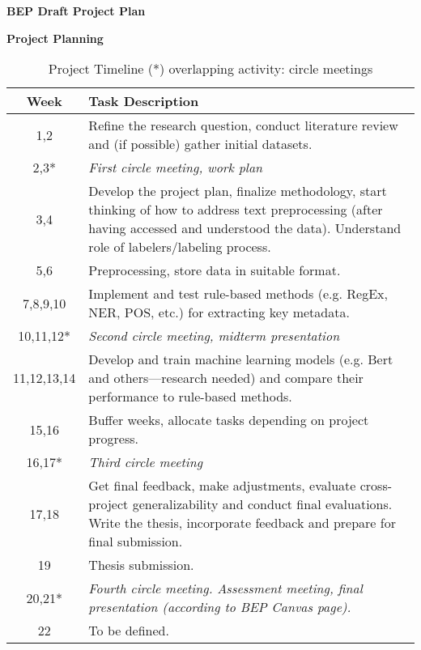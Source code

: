 \documentclass[11pt]{article}
\begin{document}

\begin{center}
{\bf BEP Draft Project Plan }
\end{center}


\textbf{Project Planning}
\begin{table}[ht]
\centering
\begin{tabular}{|c|p{12cm}|}  %
\hline
\textbf{Week} & \textbf{Task Description} \\ \hline
1,2 & Refine the research question, conduct literature review and (if possible) gather initial datasets. \\ \hline

2,3* & \textit{First circle meeting, work plan} \\ \hline

3,4 & Develop the project plan, finalize methodology, start thinking of how to address text preprocessing (after having accessed and understood the data). Understand role of labelers/labeling process.\\ \hline

5,6 & Preprocessing, store data in suitable format. \\ \hline

7,8,9,10 & Implement and test rule-based methods (e.g. RegEx, NER, POS, etc.) for extracting key metadata.\\ \hline

10,11,12* & \textit{Second circle meeting, midterm presentation} \\ \hline

11,12,13,14 & Develop and train machine learning models (e.g. Bert and others—research needed) and compare their performance to rule-based methods. \\ \hline

15,16 & Buffer weeks, allocate tasks depending on project progress. \\ \hline

16,17* & \textit{Third circle meeting} \\ \hline

17,18 & Get final feedback, make adjustments, evaluate cross-project generalizability and conduct final evaluations. Write the thesis, incorporate feedback and prepare for final submission.\\ \hline

19 &  Thesis submission. \\ \hline

20,21* & \textit{Fourth circle meeting. Assessment meeting, final presentation (according to BEP Canvas page).} \\ \hline

22 & To be defined. \\ \hline

\end{tabular}
\caption{Project Timeline (*) overlapping activity: circle meetings}
\end{table}
\end{document}
